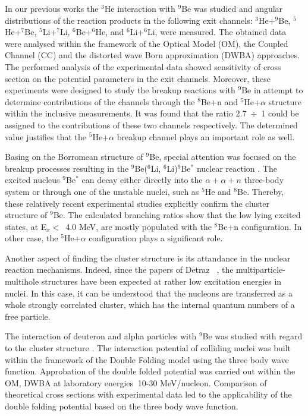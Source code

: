 \documentclass[10pt]{iopart}
\begin{document}
In our previous works \cite{lukyanov2014, lukyanov2015, janseitov2018} the ${}^3$He interaction with ${}^9$Be was studied and angular distributions of the reaction products in the following exit channels: ${}^3$He+$^9$Be, ${}^5$He+$^7$Be, ${}^5$Li+$^7$Li, ${}^6$Be+$^6$He, and ${}^6$Li+$^6$Li, were measured. The obtained data were analysed within the framework of the Optical Model (OM), the Coupled Channel (CC) and the distorted wave Born approximation (DWBA) approaches. The performed analysis of the experimental data showed  sensitivity of cross section on the potential parameters in the exit channels. Moreover, these experiments were designed to study the breakup reactions with ${}^9$Be in attempt to determine contributions of the channels through the ${}^8$Be+n  and  ${}^5$He+$\alpha$ structure within the inclusive measurements. It was found that the ratio 2.7~$\div$~1 could be assigned to the contributions of these two channels respectively. The determined value justifies that the ${}^5$He+$\alpha$ breakup channel plays an important role as well.

Basing on the Borromean structure of ${}^9$Be, special attention was focused on the breakup processes resulting in the ${}^9$Be($^6$Li, ${}^6$Li)$^9$Be$^*$ nuclear reaction \cite{brown2007, papka2007}. The excited nucleus ${}^9$Be$^*$ can decay either directly into the $\alpha+\alpha+n$ three-body system or through one of the unstable nuclei, such as ${}^5$He and ${}^8$Be. Thereby, these relatively recent experimental studies explicitly confirm the cluster structure of ${}^9$Be.
The calculated branching ratios  show that the low lying excited states, at E$_x <$~4.0 MeV,  are mostly populated with the ${}^8$Be+n configuration. In other case, the ${}^5$He+$\alpha$ configuration plays a significant  role.

Another aspect of finding the cluster structure is its attandance in the nuclear reaction mechanisms. Indeed, since the papers of Detraz \etal~\cite{detraz1970, detraz1974}, the multiparticle-multihole structures have been expected at rather low excitation energies in nuclei. In this case, it can be understood that the nucleons are transferred as a whole strongly correlated cluster, which has the internal quantum numbers of a free particle.

The interaction of deuteron and alpha particles with ${}^9$Be was studied with regard to the cluster structure \cite{urazbekov2016, urazbekov2017}. The interaction potential of colliding nuclei was built within the framework of the Double Folding model using the three body wave function. Approbation of the double folded potential was carried out within the OM, DWBA at laboratory energies $~$10-30 MeV/nucleon. Comparison of theoretical cross sections with experimental data led to the applicability of the double folding potential based on the three body wave function.
\end{document}
